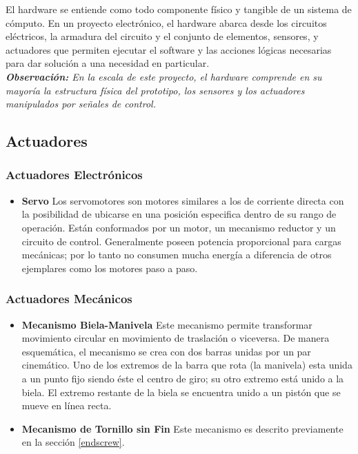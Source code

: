 

El hardware se entiende como todo componente físico y tangible de un sistema de cómputo. En un proyecto  electrónico, el hardware abarca desde los circuitos eléctricos, la armadura del circuito y el conjunto de elementos, sensores, y actuadores que permiten ejecutar el software y las acciones lógicas necesarias para dar solución a una necesidad en particular.\\

\textit{\textbf{Observación: }En la escala de este proyecto, el hardware comprende en su mayoría la estructura física del prototipo, los sensores y los actuadores  manipulados por señales de control.}

\subsection{Actuadores}
\subsubsection{Actuadores Electrónicos}
\begin{itemize}
    \item \textbf{Servo}
    Los servomotores son motores similares a los de corriente directa con la posibilidad de ubicarse en una posición especifica dentro de su rango de operación. Están conformados por un motor, un mecanismo reductor y un circuito de control. Generalmente poseen potencia proporcional para cargas mecánicas; por lo tanto no consumen mucha energía a diferencia de otros ejemplares como los motores paso a paso.
\end{itemize}
\subsubsection{Actuadores Mecánicos}
\begin{itemize}
    \item \textbf{Mecanismo Biela-Manivela}
    Este mecanismo permite transformar movimiento circular en movimiento de traslación o viceversa. De manera esquemática, el mecanismo se crea con dos barras unidas por un par cinemático. Uno de los extremos de la barra que rota (la manivela) esta unida a un punto fijo siendo éste el centro de giro; su otro extremo está unido a la biela. El extremo restante de la biela se encuentra unido a un pistón que se mueve en línea recta.
    \item \textbf{Mecanismo de Tornillo sin Fin}
    Este mecanismo es descrito previamente en la sección \ref{endscrew}.
    
\end{itemize}
